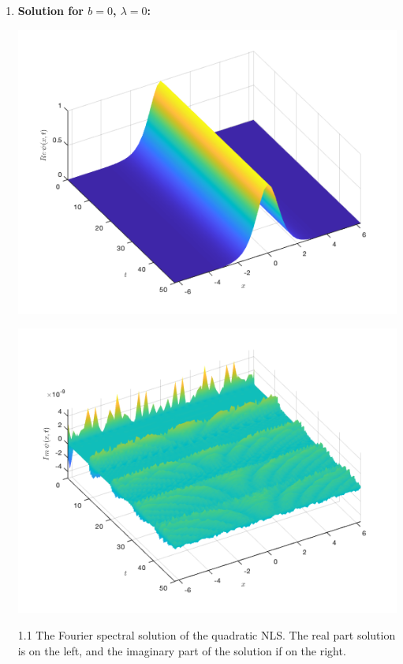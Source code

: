 \documentclass[12pt, letterpaper, twoside]{article}
\begin{document}
 \begin{enumerate}[label=(\roman*)]
\item \textbf{Solution for $b = 0$, $\lambda = 0$:}
\begin{multicols}{2}
    \begin{center}
        \includegraphics[scale=0.4]{Figures/b0real.png}
    \end{center}
    
    \begin{center}
        \includegraphics[scale=0.4]{Figures/b0imag.png}
    \end{center}
\end{multicols}
\figurename{ 1.1 The Fourier spectral solution of the quadratic NLS. The real part solution is on the left, and the imaginary part of the  solution if on the right. }

\end{enumerate}
\end{document}
